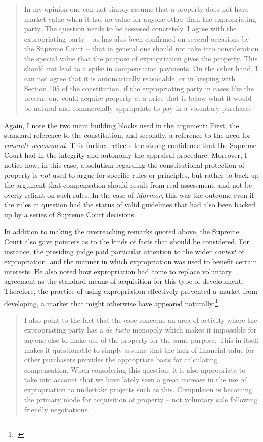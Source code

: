 \begin{quote}
In my opinion one can not simply assume that a property does not have market value when it has no value for anyone other than the expropriating party. The question needs to be assessed concretely. I agree with the expropriating party -- as has also been confirmed on several occasions by the Supreme Court -- that in general one should not take into consideration the special value that the purpose of expropriation gives the property. This should not lead to a spike in compensation payments. On the other hand, I can not agree that it is automatically reasonable, or in keeping with Section 105 of the constitution, if the expropriating party in cases like the present one could acquire property at a price that is below what it would be natural and commercially appropriate to pay in a voluntary purchase.
\end{quote}

Again, I note the two main building blocks used in the argument: First, the standard reference to the constitution, and secondly, a reference to the need for \emph{concrete assessment}. This further reflects the strong confidence that the Supreme Court had in the integrity and autonomy the appraisal procedure. Moreover, I notice how, in this case, absolutism regarding the constitutional protection of property is \emph{not} used to argue for specific rules or principles, but rather to back up the argument that compensation should result from real assessment, and not be overly reliant on such rules. In the case of {\it Marmor}, this was the outcome even if the rules in question had the status of valid guidelines that had also been backed up by a series of Supreme Court decisions.

In addition to making the overreaching remarks quoted above, the Supreme Court also gave pointers as to the kinds of facts that should be considered. For instance, the presiding judge paid particular attention to the wider \emph{context} of expropriation, and the manner in which expropriation was used to benefit certain interests. He also noted how expropriation had come to replace voluntary agreement as the standard means of acquisition for this type of development. Therefore, the practice of using expropriation effectively prevented a market from developing, a market that might otherwise have appeared naturally:\footcite[499]{marmor56}

\begin{quote}
I also point to the fact that the case concerns an area of activity where the expropriating party has a {\it de facto} monopoly which makes it impossible for anyone else to make use of the property for the same purpose. This in itself makes it questionable to simply assume that the lack of financial value for other purchasers provides the appropriate basis for calculating compensation. When considering this question, it is also appropriate to take into account that we have lately seen a great increase in the use of expropriation to undertake projects such as this. Compulsion is becoming the primary mode for acquisition of property -- not voluntary sale following friendly negotiations.
\end{quote} 

